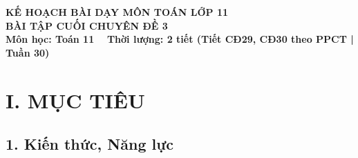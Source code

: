 \documentclass[12pt, a4paper]{article}
\begin{document}
\begin{center}
    {\fontsize{14pt}{17pt}\selectfont \textbf{KẾ HOẠCH BÀI DẠY MÔN TOÁN LỚP 11}}\\[6pt]
    {\fontsize{16pt}{19pt}\selectfont \textbf{BÀI TẬP CUỐI CHUYÊN ĐỀ 3}}\\[4pt]
    {\fontsize{12pt}{15pt}\selectfont \textbf{Môn học: Toán 11} \ \textbar \ \textbf{Thời lượng: 2 tiết (Tiết CĐ29, CĐ30 theo PPCT | Tuần 30)}}
\end{center}

\vspace{5pt}

\section*{I. MỤC TIÊU}

\subsection*{1. Kiến thức, Năng lực}
\end{document}
